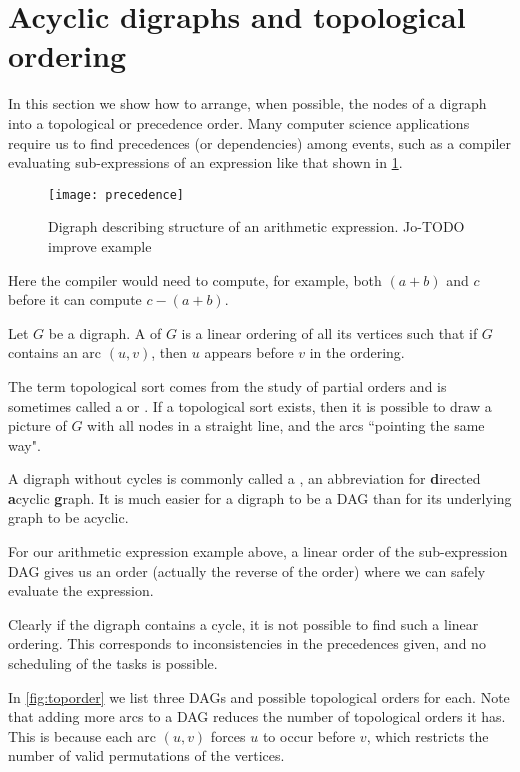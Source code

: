 \section{Acyclic digraphs and topological ordering}
\label{sec:dag}

In this section we show how to arrange, when possible, the nodes
of a digraph into a topological or precedence order.  Many computer
science applications require us to find precedences (or dependencies)
among events, such as a compiler evaluating sub-expressions of an
expression like that shown in \cref{fig:prec}.

\begin{figure}[hbtp]
	\centering
	\texttt{[image: precedence]}
	\caption{Digraph describing structure of an arithmetic expression. Jo-TODO improve example}
	\label{fig:prec}
\end{figure} 

Here the compiler would need to compute, for example, both $(a+b)$ and
$c$ before it can compute $c-(a+b)$.

\begin{Definition}
Let $G$ be a digraph. A  of $G$ is a linear
ordering of all its vertices such that if $G$ contains an arc $(u,v)$,
then $u$ appears before $v$ in the ordering.
\end{Definition}

The term topological sort comes from the study of partial orders and is
sometimes called a  or .
 If a topological sort exists, then it is possible to draw a picture  of
$G$ with all nodes in a straight line, and the arcs ``pointing the same
way".

A digraph without cycles is commonly called a , an
abbreviation for \textbf{d}irected \textbf{a}cyclic
\textbf{g}raph. It is much easier for a digraph to be a
DAG than for its underlying graph to be acyclic. %

For our arithmetic expression example above, a linear
order of the sub-expression DAG gives us an order (actually the reverse
of the order) where we can safely evaluate the expression.

Clearly if the digraph contains a cycle, it is not possible to find
such a linear ordering. This corresponds to inconsistencies in the
precedences given, and no scheduling of the tasks is possible.

\begin{Example}
\label{eg:toporder}
In \cref{fig:toporder} we list three DAGs and possible topological
orders for each. Note that adding more arcs to a DAG  reduces the number
of topological orders it has.  This is because each arc $(u,v)$ forces
$u$ to occur before $v$, which restricts the number of valid permutations
of the vertices.
\end{Example}

